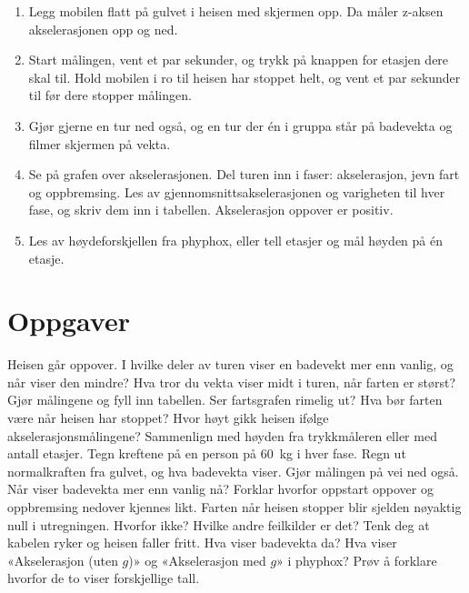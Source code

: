 \documentclass[11pt]{article}
\begin{document}
\begin{enumerate}
\item Legg mobilen flatt på gulvet i heisen med skjermen opp. Da måler z-aksen akselerasjonen opp og ned.
\item Start målingen, vent et par sekunder, og trykk på knappen for etasjen dere skal til. Hold mobilen i ro til heisen har stoppet helt, og vent et par sekunder til før dere stopper målingen.
\item Gjør gjerne en tur ned også, og en tur der én i gruppa står på badevekta og filmer skjermen på vekta.
\item Se på grafen over akselerasjonen. Del turen inn i faser: akselerasjon, jevn fart og oppbremsing. Les av gjennomsnittsakselerasjonen og varigheten til hver fase, og skriv dem inn i tabellen. Akselerasjon oppover er positiv.
\item Les av høydeforskjellen fra phyphox, eller tell etasjer og mål høyden på én etasje.
\end{enumerate}

\section*{Oppgaver}

\begin{oppgaveliste}
\oppgave {}Heisen går oppover. I hvilke deler av turen viser en badevekt mer enn vanlig, og når viser den mindre? Hva tror du vekta viser midt i turen, når farten er størst?
\svar
\oppgave {}Gjør målingene og fyll inn tabellen. Ser fartsgrafen rimelig ut? Hva bør farten være når heisen har stoppet?
\svar
\oppgave {}Hvor høyt gikk heisen ifølge akselerasjonsmålingene? Sammenlign med høyden fra trykkmåleren eller med antall etasjer.
\svar
\oppgave {}Tegn kreftene på en person på 60~kg i hver fase. Regn ut normalkraften fra gulvet, og hva badevekta viser.
\svar
\oppgave {}Gjør målingen på vei ned også. Når viser badevekta mer enn vanlig nå? Forklar hvorfor oppstart oppover og oppbremsing nedover kjennes likt.
\svar
\oppgave {}Farten når heisen stopper blir sjelden nøyaktig null i utregningen. Hvorfor ikke? Hvilke andre feilkilder er det?
\svar
\oppgave {}Tenk deg at kabelen ryker og heisen faller fritt. Hva viser badevekta da? Hva viser «Akselerasjon (uten $g$)» og «Akselerasjon med $g$» i phyphox? Prøv å forklare hvorfor de to viser forskjellige tall.
\svar
\end{oppgaveliste}
\end{document}
